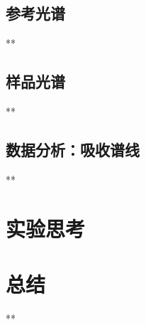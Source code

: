 \documentclass{ctexart}
\begin{document}
\subsection{参考光谱}
**

\subsection{样品光谱}
**

\subsection{数据分析：吸收谱线}
**

\section{实验思考}

\section{总结}
**
\end{document}
